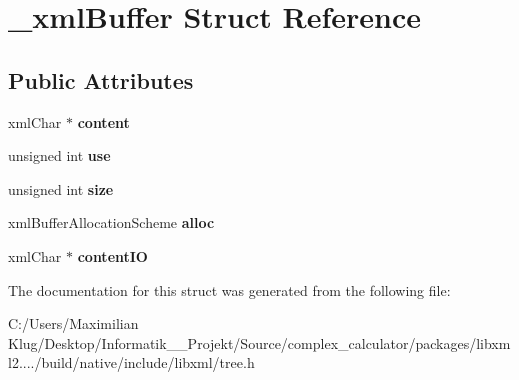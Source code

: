 \hypertarget{struct__xml_buffer}{}\section{\+\_\+xml\+Buffer Struct Reference}
\label{struct__xml_buffer}
\subsection*{Public Attributes}
\begin{DoxyCompactItemize}
\item 
\mbox{\label{struct__xml_buffer_aec9312296378e1d503fce977e45e40bb}} 
xml\+Char $\ast$ {\bfseries content}
\item 
\mbox{\label{struct__xml_buffer_aaf67415a2fbcd5030c7d3f828b735ad6}} 
unsigned int {\bfseries use}
\item 
\mbox{\label{struct__xml_buffer_a9729e805b7736692f496eefac6103210}} 
unsigned int {\bfseries size}
\item 
\mbox{\label{struct__xml_buffer_acac8aee322443ed7a9d0854ee5a87b02}} 
xml\+Buffer\+Allocation\+Scheme {\bfseries alloc}
\item 
\mbox{\label{struct__xml_buffer_add445d2ccadd92de7a65b26c82c43943}} 
xml\+Char $\ast$ {\bfseries content\+IO}
\end{DoxyCompactItemize}


The documentation for this struct was generated from the following file\+:\begin{DoxyCompactItemize}
\item 
C\+:/\+Users/\+Maximilian Klug/\+Desktop/\+Informatik\+\_\+\_\+\+Projekt/\+Source/complex\+\_\+calculator/packages/libxml2..../build/native/include/libxml/tree.\+h\end{DoxyCompactItemize}
